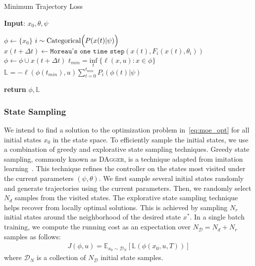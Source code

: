 \begin{enumerate}
    \begin{algorithm}[H]
        \caption{Minimum Trajectory Loss}
        \label{algo:mtl}
        \small
        \hspace*{\algorithmicindent} \textbf{Input}: $x_0, \theta, \psi$
        \begin{algorithmic}[1]
            \State $\phi \leftarrow \{x_0\}$
                    \State $i \sim \text{Categorical}\Bigl(P(x(t)| \psi)\Bigr)$ 
                    \State $x(t + \Delta t) \leftarrow \texttt{Moreau's one time step}(x(t), F_i(x(t), \theta_i))$
                    \State $\phi \leftarrow \phi \cup x(t + \Delta t)$
                \EndFor
                \State $t_{min} = \underset{t}{\textrm{inf}} \; \{ \ell(x, u): x \in \phi\}$
                \State $\mathbb{L} = - \ell(\phi(t_{min}), u) \sum_{t=0}^{t_{min}}P_i(\phi(t) | \psi)  $

            \State \textbf{return} $\phi, \mathbb{L}$
        \end{algorithmic}
    \end{algorithm}
\end{enumerate}

\subsubsection{State Sampling}
\label{sssec:state_sampling}

We intend to find a solution to the optimization problem
in~\eqref{eq:moe_opt} for all initial states $x_0$ in the
state space.
%
To efficiently sample the initial states, we use a combination of greedy and
explorative state sampling techniques.
%
Greedy state sampling, commonly known as \textsc{DAgger}, is a technique
adapted from imitation learning~\cite{ross2011no}.
%
This technique refines the controller on the states most visited under the
current parameters $(\psi, \theta)$.
%
We first sample several initial states randomly and generate trajectories using
the current parameters.
%
Then, we randomly select $N_d$ samples from the visited states. 
%
The explorative state sampling technique helps recover from locally optimal
solutions. 
%
This is achieved by sampling $N_r$ initial states around the neighborhood of the
desired state $x^*$.
%
In a single batch training, we compute the running cost as an expectation
over $N_{\mathcal{D}} = N_d+N_r$ samples as follows:
\begin{align*}
    J(\phi, u) = \mathbb{E}_{x_0 \sim \mathcal{D}_N}[ \mathbb{L}(\phi(x_0, u, T))]
\end{align*}
\noindent where $\mathcal{D}_N$ is a collection of $N_{\mathcal{D}}$ initial state samples.

